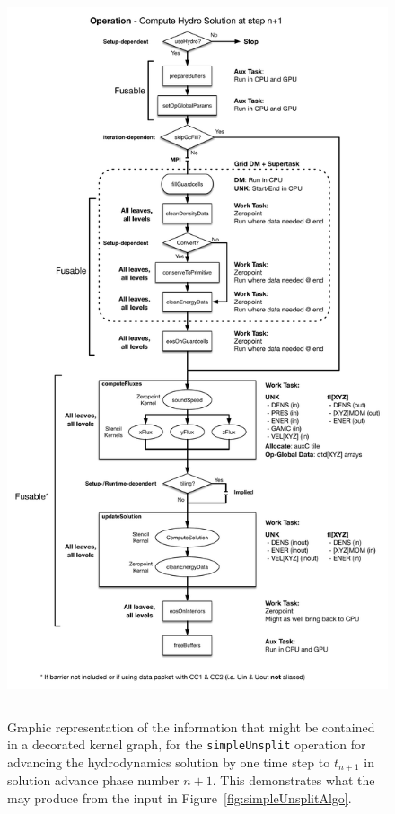 \documentclass{article}
\begin{document}
\begin{figure}[!hp]
\begin{center}
\includegraphics[height=8.5in]{simpleUnsplitFlow.pdf}
\caption[]{Graphic representation of the information that might be contained in a decorated kernel graph,
for the
\texttt{simpleUnsplit} operation for advancing the hydrodynamics solution by one time step to $t_{n+1}$
in solution advance phase number $n+1$.
This demonstrates what the \KGC may produce from the input in Figure~\ref{fig:simpleUnsplitAlgo}.}
\label{fig:simpleUnsplitKernelGraph}
\end{center}
\end{figure}
\end{document}
